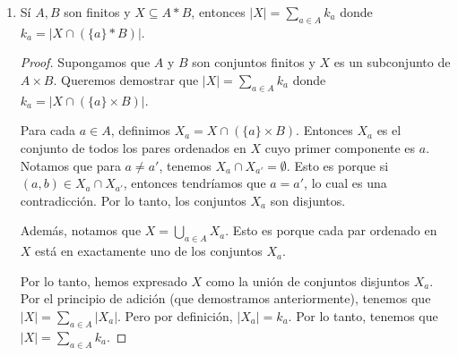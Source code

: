 \documentclass{article}
\begin{document}
\begin{enumerate}
\begin{proof}
      Para construir una función inyectiva $f : Y \rightarrow X$, necesitamos asignar a cada elemento de $Y$ un elemento único de $X$. Hay $n$ opciones para la imagen del primer elemento de $Y$, ya que hay $n$ elementos en $X$. Después de asignar la imagen del primer elemento, hay $n - 1$ opciones para la imagen del segundo elemento, ya que no podemos asignarle el mismo elemento que al primer elemento (la función debe ser inyectiva). Continuamos de esta manera, y para el $k$-étimo elemento de $Y$, hay $n - k + 1$ opciones para su imagen.

      Por lo tanto, el número total de funciones inyectivas $f : Y \rightarrow X$ es $n \cdot (n - 1) \cdot \ldots \cdot (n - k + 1)$.
    \end{proof}

  \item Sí $A,B$ son finitos y $ X \subseteq A * B$, entonces $|X| = \sum_{a \in A}k_a$ donde $k_a = |X \cap (\{a\}*B)|$.
    \begin{proof}
      Supongamos que $A$ y $B$ son conjuntos finitos y $X$ es un subconjunto de $A \times B$. Queremos demostrar que $|X| = \sum_{a \in A} k_a$ donde $k_a = |X \cap (\{a\} \times B)|$.

      Para cada $a \in A$, definimos $X_a = X \cap (\{a\} \times B)$. Entonces $X_a$ es el conjunto de todos los pares ordenados en $X$ cuyo primer componente es $a$. Notamos que para $a \neq a'$, tenemos $X_a \cap X_{a'} = \emptyset$. Esto es porque si $(a, b) \in X_a \cap X_{a'}$, entonces tendríamos que $a = a'$, lo cual es una contradicción. Por lo tanto, los conjuntos $X_a$ son disjuntos.

      Además, notamos que $X = \bigcup_{a \in A} X_a$. Esto es porque cada par ordenado en $X$ está en exactamente uno de los conjuntos $X_a$.

      Por lo tanto, hemos expresado $X$ como la unión de conjuntos disjuntos $X_a$. Por el principio de adición (que demostramos anteriormente), tenemos que $|X| = \sum_{a \in A} |X_a|$. Pero por definición, $|X_a| = k_a$. Por lo tanto, tenemos que $|X| = \sum_{a \in A} k_a$.
    \end{proof}
\end{enumerate}
\end{document}
